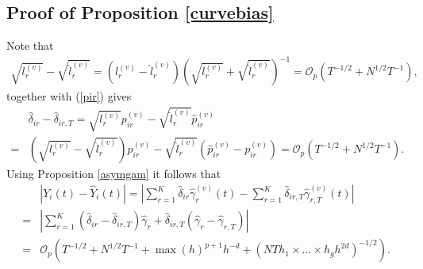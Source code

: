 %
%
\subsection{Proof of Proposition \ref{curvebias}}\label{Proof2.5}
Note that
\begin{equation}
\begin{split}
\sqrt{l^{(v)}_r} - \sqrt{\hat{l}^{(v)}_r} = (l^{(v)}_r - \hat{l}^{(v)}_r)(\sqrt{l^{(v)}_r} + \sqrt{\hat{l}^{(v)}_r})^{-1}= \mathcal{O}_p(T^{-1/2} + N^{1/2}T^{-1}),
\end{split}
\end{equation}
together with (\ref{pir}) gives
\begin{equation}
\begin{split}
&\hat{\delta}_{ir}-\hat{\delta}_{ir,T}= \sqrt{l^{(v)}_r} p^{(v)}_{ir}  - \sqrt{\hat{l}^{(v)}_r} \hat{p}^{(v)}_{ir}  \\
=& \left( \sqrt{l^{(v)}_r} - \sqrt{\hat{l}^{(v)}_r} \right) p^{(v)}_{ir}  -  \sqrt{\hat{l}^{(v)}_r} \left(  \hat{p}^{(v)}_{ir} -  p^{(v)}_{ir}\right) = \mathcal{O}_p(T^{-1/2} + N^{1/2}T^{-1}).
\end{split}
\end{equation}
Using Proposition \ref{asymgam} it follows that
\begin{equation}
\begin{split}
&|Y_i(t) - \hat{Y}_i(t)|= |\sum_{r=1}^K \hat{\delta}_{ir} \hat{\gamma}^{(v)}_r(t) - \sum_{r=1}^K \hat{\delta}_{ir,T} \hat{\gamma}^{(v)}_{r,T}(t)| \\
=& |\sum_{r=1}^K (\hat{\delta}_{ir}-\hat{\delta}_{ir,T}) \hat{\gamma}_r + \hat{\delta}_{ir,T} (\hat{\gamma}_r-\hat{\gamma}_{r,T})| \\
=& \mathcal{O}_p\left(T^{-1/2} + N^{1/2}T^{-1} +  \max(h)^{p+1} h^{-d}  +(N T  h_1 \times \dots \times h_g h^{2d} )^{-1/2} \right).
\end{split}
\end{equation}
